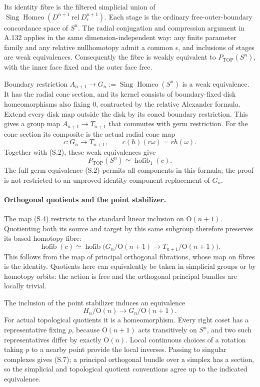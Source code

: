Its identity fibre is the filtered simplicial union of
$\operatorname{Sing}\operatorname{Homeo}(D^{n+1}\ \mathrm{rel}\
D_\epsilon^{n+1})$. Each stage is the ordinary free-outer-boundary
concordance space of $S^n$. The radial conjugation and compression
argument in A.132 applies in the same dimension-independent way:
any finite parameter family and any relative nullhomotopy admit a
common $\epsilon$, and inclusions of stages are weak equivalences.
Consequently the fibre is weakly equivalent to
$P_{\mathrm{TOP}}(S^n)$, with the inner face fixed and the outer
face free.

Boundary restriction $A_{n+1}\to
G_n:=\operatorname{Sing}\operatorname{Homeo}(S^n)$ is a weak
equivalence. It has the radial cone section, and its kernel consists
of boundary-fixed disk homeomorphisms also fixing $0$, contracted
by the relative Alexander formula. Extend every disk map outside
the disk by its coned boundary restriction. This gives a group map
$A_{n+1}\to T_{n+1}$ that commutes with germ restriction.
For the cone section its composite is the actual radial cone map
\[
 c:G_n\longrightarrow T_{n+1},\qquad
 c(h)(r\omega)=r h(\omega).                             \tag{S.4}
\]
Together with (S.2), these weak equivalences give
\[
 P_{\mathrm{TOP}}(S^n)\simeq\operatorname{hofib}_1(c).
                                                               \tag{S.5}
\]
The full germ equivalence (S.2) permits all components in this
formula; the proof is not restricted to an unproved identity-component
replacement of $G_n$.

\paragraph{Orthogonal quotients and the point stabilizer.}
The map (S.4) restricts to the standard linear inclusion on
$\mathrm O(n+1)$. Quotienting both its source and target by this
same subgroup therefore preserves its based homotopy fibre:
\[
 \operatorname{hofib}(c)\simeq
 \operatorname{hofib}\bigl(
 G_n/\mathrm O(n+1)\longrightarrow
 T_{n+1}/\mathrm O(n+1)\bigr).                          \tag{S.6}
\]
This follows from the map of principal orthogonal fibrations,
whose map on fibres is the identity. Quotients here can equivalently
be taken in simplicial groups or by homotopy orbits: the action is
free and the orthogonal principal bundles are locally trivial.

The inclusion of the point stabilizer induces an equivalence
\[
 H_n/\mathrm O(n)\longrightarrow G_n/\mathrm O(n+1).
                                                               \tag{S.7}
\]
For actual topological quotients it is a homeomorphism. Every right
coset has a representative fixing $p$, because $\mathrm O(n+1)$
acts transitively on $S^n$, and two such representatives differ
by exactly $\mathrm O(n)$. Local continuous choices of a rotation
taking $p$ to a nearby point provide the local inverses. Passing
to singular complexes gives (S.7); a principal orthogonal bundle
over a simplex has a section, so the simplicial and topological
quotient conventions agree up to the indicated equivalence.

